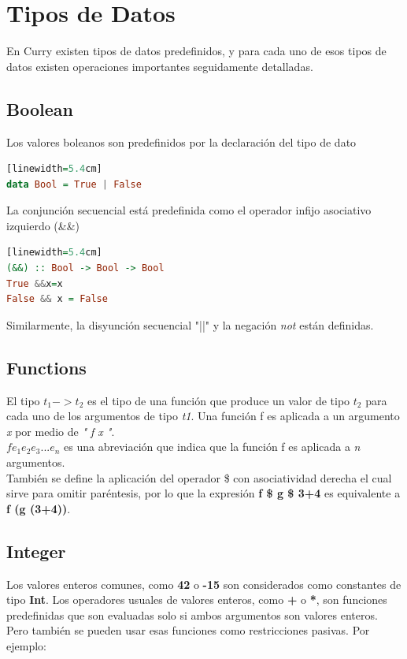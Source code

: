 \documentclass[10pt,journal,compsoc]{IEEEtran}
\begin{document}
\section{Tipos de Datos}
En Curry  existen tipos de datos predefinidos, y para cada uno de esos tipos de datos existen operaciones importantes seguidamente detalladas. \newline 

\subsection{Boolean}
Los valores boleanos son predefinidos por la declaraci\'on del tipo de dato
\begin{lstlisting}[language=Haskell, caption = {C\'odigo de tipo de dato bool}][linewidth=5.4cm]
data Bool = True | False
\end{lstlisting}
La conjunci\'on secuencial est\'a predefinida como el operador infijo asociativo izquierdo (\&\&)

\begin{lstlisting}[language=Haskell, caption = {C\'odigo de ejemplo de datos bool}][linewidth=5.4cm]
(&&) :: Bool -> Bool -> Bool 
True &&x=x
False && x = False
\end{lstlisting}

Similarmente, la disyunci\'on secuencial "||" y la negaci\'on \emph{not} est\'an definidas.

\subsection{Functions}
El tipo \emph{$t_{1} -> t_{2}$} es el tipo de una funci\'on que produce un valor de tipo \emph{$t_{2}$}  para cada uno de los argumentos de tipo \emph{t1}. Una funci\'on f es aplicada a un argumento \emph{x} por medio de \emph{" f x "}. \\
\emph{$f e_{1} e_{2} e_{3} ... e_{n}$} es una abreviaci\'on que indica que la funci\'on f es aplicada a \emph{n} argumentos. \\
Tambi\'en se define la aplicaci\'on del operador \$ con asociatividad derecha el cual sirve para omitir par\'entesis, por lo que la expresi\'on \textbf{f \$ g \$ 3+4} es equivalente a \textbf{f (g (3+4))}.

\subsection{Integer}
Los valores enteros comunes, como \textbf{42} o \textbf{-15} son considerados como constantes de tipo \textbf{Int}. Los operadores usuales de valores enteros, como \textbf{+} o \textbf{*}, son funciones predefinidas que son evaluadas solo si ambos argumentos son valores enteros. Pero tambi\'en se pueden usar esas funciones como restricciones pasivas. Por ejemplo: \\
\end{document}
